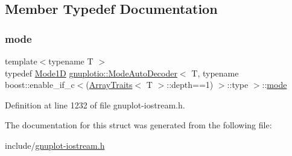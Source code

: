 \subsection{Member Typedef Documentation}
\mbox{\label{structgnuplotio_1_1_mode_auto_decoder_3_01_t_00_01typename_01boost_1_1enable__if__c_3_07_array_t1ec50a546e6580c42fe67da3e27f4154_a4864f829821c6058d5ada30fb74731ca}} 
\subsubsection{\texorpdfstring{mode}{mode}}
{\footnotesize\ttfamily template$<$typename T $>$ \\
typedef \hyperlink{structgnuplotio_1_1_mode1_d}{Mode1D} \hyperlink{structgnuplotio_1_1_mode_auto_decoder}{gnuplotio\+::\+Mode\+Auto\+Decoder}$<$ T, typename boost\+::enable\+\_\+if\+\_\+c$<$(\hyperlink{classgnuplotio_1_1_array_traits}{Array\+Traits}$<$ T $>$\+::depth==1) $>$\+::type $>$\+::\hyperlink{structgnuplotio_1_1_mode_auto_decoder_3_01_t_00_01typename_01boost_1_1enable__if__c_3_07_array_t1ec50a546e6580c42fe67da3e27f4154_a4864f829821c6058d5ada30fb74731ca}{mode}}



Definition at line 1232 of file gnuplot-\/iostream.\+h.



The documentation for this struct was generated from the following file\+:\begin{DoxyCompactItemize}
\item 
include/\hyperlink{gnuplot-iostream_8h}{gnuplot-\/iostream.\+h}\end{DoxyCompactItemize}
